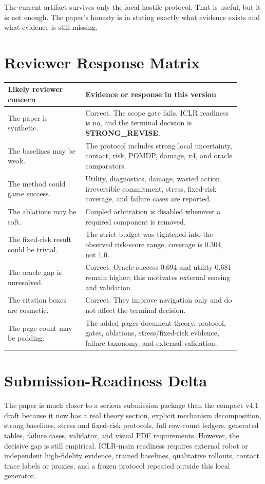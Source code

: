 \documentclass{article}
\newcommand{\terminal}{\textbf{STRONG\_REVISE}}
\begin{document}
The current artifact survives only the local hostile protocol. That is useful, but it is not enough. The paper's honesty is in stating exactly what evidence exists and what evidence is still missing.

\clearpage
\section{Reviewer Response Matrix}
\begin{longtable}{p{0.30\linewidth}p{0.60\linewidth}}
\toprule
Likely reviewer concern & Evidence or response in this version \\
\midrule
The paper is synthetic. & Correct. The scope gate fails, ICLR readiness is no, and the terminal decision is \terminal. \\
The baselines may be weak. & The protocol includes strong local uncertainty, contact, risk, POMDP, damage, v4, and oracle comparators. \\
The method could game success. & Utility, diagnostics, damage, wasted action, irreversible commitment, stress, fixed-risk coverage, and failure cases are reported. \\
The ablations may be soft. & Coupled arbitration is disabled whenever a required component is removed. \\
The fixed-risk result could be trivial. & The strict budget was tightened into the observed risk-score range; coverage is 0.304, not 1.0. \\
The oracle gap is unresolved. & Correct. Oracle success 0.694 and utility 0.681 remain higher; this motivates external sensing and validation. \\
The citation boxes are cosmetic. & Correct. They improve navigation only and do not affect the terminal decision. \\
The page count may be padding. & The added pages document theory, protocol, gates, ablations, stress/fixed-risk evidence, failure taxonomy, and external validation. \\
\bottomrule
\end{longtable}

\section{Submission-Readiness Delta}
The paper is much closer to a serious submission package than the compact v4.1 draft because it now has a real theory section, explicit mechanism decomposition, strong baselines, stress and fixed-risk protocols, full row-count ledgers, generated tables, failure cases, validator, and visual PDF requirements. However, the decisive gap is still empirical. ICLR-main readiness requires external robot or independent high-fidelity evidence, trained baselines, qualitative rollouts, contact trace labels or proxies, and a frozen protocol repeated outside this local generator.
\end{document}
